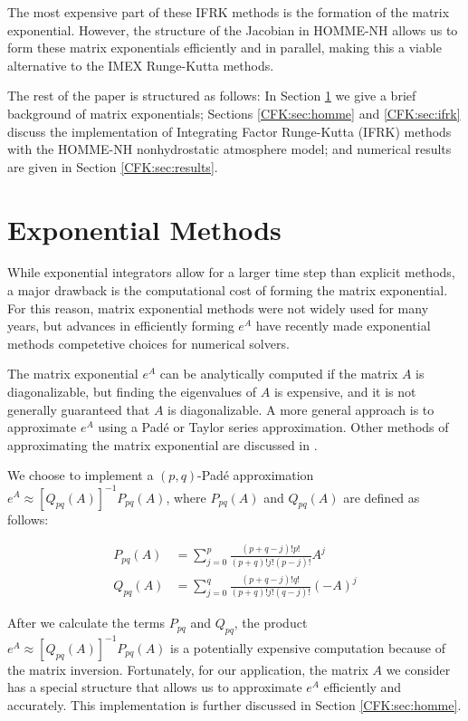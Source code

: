 \documentclass{csri19}
\begin{document}
The most expensive part of these IFRK methods is the formation of the 
matrix exponential. However, the structure of the Jacobian in HOMME-NH 
allows us to form these matrix exponentials efficiently and in parallel, 
making this a viable alternative to the IMEX Runge-Kutta methods.

The rest of the paper is structured as follows: In Section 
\ref{CFK:sec:matexp} we give a brief background of matrix exponentials; 
Sections \ref{CFK:sec:homme} and \ref{CFK:sec:ifrk} discuss the
implementation of Integrating Factor Runge-Kutta (IFRK) methods with the
HOMME-NH nonhydrostatic atmosphere model; and numerical results are given 
in Section \ref{CFK:sec:results}.

\section{Exponential Methods}\label{CFK:sec:matexp} 
While exponential integrators allow for a larger time step than explicit 
methods, a major drawback is the computational cost of forming the matrix
exponential. For this reason, matrix exponential methods were not widely 
used for many years, but advances in efficiently forming $e^A$ have 
recently made exponential methods competetive choices for numerical solvers.

The matrix exponential $e^A$ can be analytically computed if the matrix $A$
 is diagonalizable, but finding the eigenvalues of $A$ is expensive, and it
 is not generally guaranteed that $A$ is diagonalizable. A more general 
approach is to approximate $e^{A}$ using a Pad\'e or Taylor series 
approximation. Other methods of approximating the matrix exponential are 
discussed in \cite{CFK:Moler2003}.

We choose to implement a $(p,q)$-Pad\'e approximation 
$e^{A}\approx \left[Q_{pq}(A)\right]^{-1}P_{pq}(A)$, where $P_{pq}(A)$ and 
$Q_{pq}(A)$ are defined as follows:

\begin{align*}
P_{pq}(A) &= \sum_{j=0}^p\frac{(p+q-j)!p!}{(p+q)!j!(p-j)!}A^j\\
Q_{pq}(A) &= \sum_{j=0}^q\frac{(p+q-j)!q!}{(p+q)!j!(q-j)!}(-A)^j
\end{align*}

After we calculate the terms $P_{pq}$ and $Q_{pq}$, the product 
$e^A\approx\left[Q_{pq}(A)\right]^{-1}P_{pq}(A)$ is a potentially 
expensive computation because of the matrix inversion. Fortunately, for our
 application, the matrix $A$ we consider has a special structure that allows
us to approximate $e^A$ efficiently and accurately. This implementation is 
further discussed in Section \ref{CFK:sec:homme}.
\end{document}
